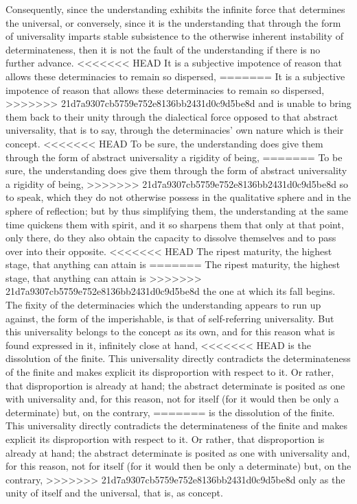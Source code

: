 Consequently, since the understanding exhibits
the infinite force that determines the universal,
or conversely, since it is the understanding
that through the form of universality
imparts stable subsistence to the otherwise
inherent instability of determinateness,
then it is not the fault of the understanding
if there is no further advance.
<<<<<<< HEAD
It is a subjective impotence of reason 
that allows these determinacies to remain so dispersed, 
=======
It is a subjective impotence of reason
that allows these determinacies to remain so dispersed,
>>>>>>> 21d7a9307cb5759e752e8136bb2431d0c9d5be8d
and is unable to bring them back to their unity
through the dialectical force opposed
to that abstract universality,
that is to say, through the determinacies'
own nature which is their concept.
<<<<<<< HEAD
To be sure, the understanding does give them 
through the form of abstract universality a rigidity of being, 
=======
To be sure, the understanding does give them
through the form of abstract universality a rigidity of being,
>>>>>>> 21d7a9307cb5759e752e8136bb2431d0c9d5be8d
so to speak, which they do not otherwise possess
in the qualitative sphere and in the sphere of reflection;
but by thus simplifying them, the understanding
at the same time quickens them with spirit,
and it so sharpens them that only at that point,
only there, do they also obtain the capacity
to dissolve themselves and to pass over into their opposite.
<<<<<<< HEAD
The ripest maturity, the highest stage, 
that anything can attain is 
=======
The ripest maturity, the highest stage,
that anything can attain is
>>>>>>> 21d7a9307cb5759e752e8136bb2431d0c9d5be8d
the one at which its fall begins.
The fixity of the determinacies
which the understanding appears to run up against,
the form of the imperishable,
is that of self-referring universality.
But this universality belongs to the concept as its own,
and for this reason what is found expressed in it,
infinitely close at hand,
<<<<<<< HEAD
is the dissolution of the finite. 
This universality directly contradicts
the determinateness of the finite
and makes explicit its disproportion 
with respect to it. 
Or rather, that disproportion is already at hand; 
the abstract determinate is posited as
one with universality 
and, for this reason, not for itself 
(for it would then be only a determinate) 
but, on the contrary, 
=======
is the dissolution of the finite.
This universality directly contradicts
the determinateness of the finite
and makes explicit its disproportion
with respect to it.
Or rather, that disproportion is already at hand;
the abstract determinate is posited as
one with universality
and, for this reason, not for itself
(for it would then be only a determinate)
but, on the contrary,
>>>>>>> 21d7a9307cb5759e752e8136bb2431d0c9d5be8d
only as the unity of itself and the universal,
that is, as concept.


